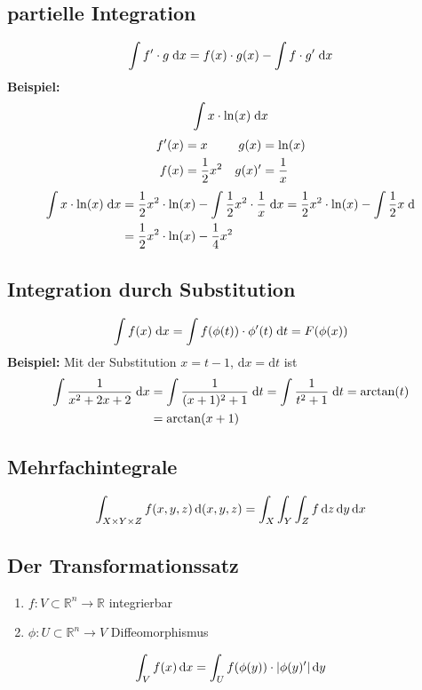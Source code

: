\documentclass[ngerman,a4paper]{article}
\begin{document}
\subsection{partielle Integration}
\begin{align}
	\int f'\cdot g\;\mathrm{d}x=f(x)\cdot g(x)-\int f\cdot g'\;\mathrm{d}x\notag
\end{align}
\textbf{Beispiel:} 
\begin{align}
	\int x\cdot \ln(x) \;\mathrm{d}x\notag
\end{align}
\begin{align}
	f'(x) &= x & g(x) &= \ln(x) \notag \\
	f(x) &= \frac{1}{2}x^2 & g(x)' &= \frac{1}{x}\notag
\end{align}
\begin{align}
	\int x\cdot \ln(x) \;\mathrm{d}x &= \frac{1}{2}x^2\cdot\ln(x)-\int \frac{1}{2}x^2\cdot\frac{1}{x}\;\mathrm{d}x = \frac{1}{2}x^2\cdot\ln(x)-\int \frac{1}{2}x\;\mathrm{d} \notag \\
	&= \frac{1}{2}x^2\cdot\ln(x)-\frac{1}{4}x^2\notag
\end{align}

\subsection{Integration durch Substitution}
\begin{align}
	\int f(x)\;\mathrm{d}x = \int f(\phi(t))\cdot\phi'(t)\;\mathrm{d}t=F(\phi(x))\notag
\end{align}
\textbf{Beispiel:} Mit der Substitution $x=t-1$, $\mathrm{d}x=\mathrm{d}t$ ist
\begin{align}
	\int\frac{1}{x^2+2x+2}\;\mathrm{d}x &= \int\frac{1}{(x+1)^2+1}\;\mathrm{d}t = \int\frac{1}{t^2+1}\;\mathrm{d}t = \arctan(t) \notag \\
	&= \arctan(x+1)\notag
\end{align}

\subsection{Mehrfachintegrale}
\begin{align}
	\int_{X\times Y\times Z} f(x,y,z)\,\mathrm{d}(x,y,z) = \int_X\int_Y\int_Z f\,\mathrm{d}z\,\mathrm{d}y\,\mathrm{d}x\notag
\end{align}

\subsection{Der Transformationssatz}
\begin{enumerate}[label=\textbf{\arabic*.}]
	\item $f:V\subset \mathbb{R}^n\to\mathbb{R}$ integrierbar
	\item $\phi:U\subset\mathbb{R}^n\to V$ Diffeomorphismus
\end{enumerate}
\begin{align}
	\int_V f(x)\,\mathrm{d}x=\int_U f(\phi(y))\cdot\vert\phi(y)'\vert\,\mathrm{d}y\notag
\end{align}
\end{document}
